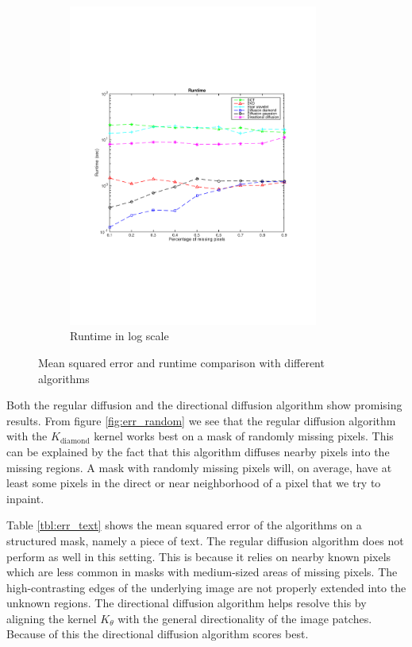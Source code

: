 \begin{figure}
\begin{subfigure}[b]{0.49\textwidth}
		\includegraphics[clip, trim=2cm 7cm 2cm 6cm, width=0.9\textwidth]{figures/runtime_vector}
		\caption{Runtime in log scale}
		\label{fig:runtime}
	\end{subfigure}
	
	\caption{Mean squared error and runtime comparison with different algorithms}
	\label{fig:rmd_results}
\end{figure}


Both the regular diffusion and the directional diffusion algorithm show promising results. From figure \ref{fig:err_random} we see that the regular diffusion algorithm with the $K_{\text{diamond}}$ kernel works best on a mask of randomly missing pixels. This can be explained by the fact that this algorithm diffuses nearby pixels into the missing regions. A mask with randomly missing pixels will, on average, have at least some pixels in the direct or near neighborhood of a pixel that we try to inpaint.

Table \ref{tbl:err_text} shows the mean squared error of the algorithms on a structured mask, namely a piece of text. The regular diffusion algorithm does not perform as well in this setting. This is because it relies on nearby known pixels which are less common in masks with medium-sized areas of missing pixels. The high-contrasting edges of the underlying image are not properly extended into the unknown regions. The directional diffusion algorithm helps resolve this by aligning the kernel  $K_{\theta}$ with the general directionality of the image patches. Because of this the directional diffusion algorithm scores best.

